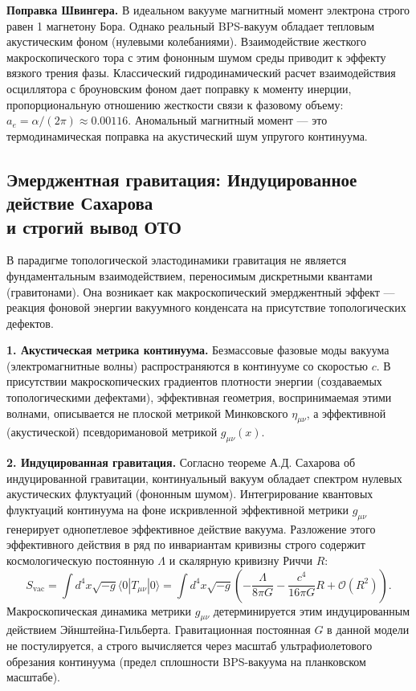 \documentclass[11pt,a4paper]{article}
\begin{document}
	\textbf{Поправка Швингера.} В идеальном вакууме магнитный момент электрона строго равен 1 магнетону Бора. Однако реальный BPS-вакуум обладает тепловым акустическим фоном (нулевыми колебаниями). Взаимодействие жесткого макроскопического тора с этим фононным шумом среды приводит к эффекту вязкого трения фазы. Классический гидродинамический расчет взаимодействия осциллятора с броуновским фоном дает поправку к моменту инерции, пропорциональную отношению жесткости связи к фазовому объему: $a_e = \alpha / (2\pi) \approx 0.00116$. Аномальный магнитный момент — это термодинамическая поправка на акустический шум упругого континуума.
	
	\subsection{Эмерджентная гравитация: Индуцированное действие Сахарова\\ и строгий вывод ОТО}
	В парадигме топологической эластодинамики гравитация не является фундаментальным взаимодействием, переносимым дискретными квантами (гравитонами). Она возникает как макроскопический эмерджентный эффект — реакция фоновой энергии вакуумного конденсата на присутствие топологических дефектов.
	
	\textbf{1. Акустическая метрика континуума.}
	Безмассовые фазовые моды вакуума (электромагнитные волны) распространяются в континууме со скоростью $c$. В присутствии макроскопических градиентов плотности энергии (создаваемых топологическими дефектами), эффективная геометрия, воспринимаемая этими волнами, описывается не плоской метрикой Минковского $\eta_{\mu\nu}$, а эффективной (акустической) псевдоримановой метрикой $g_{\mu\nu}(x)$. 
	
	\textbf{2. Индуцированная гравитация.}
	Согласно теореме А.Д. Сахарова об индуцированной гравитации, континуальный вакуум обладает спектром нулевых акустических флуктуаций (фононным шумом). Интегрирование квантовых флуктуаций континуума на фоне искривленной эффективной метрики $g_{\mu\nu}$ генерирует однопетлевое эффективное действие вакуума. 
	Разложение этого эффективного действия в ряд по инвариантам кривизны строго содержит космологическую постоянную $\Lambda$ и скалярную кривизну Риччи $R$:
	\begin{equation}
		S_{\text{vac}} = \int d^4x \sqrt{-g} \langle 0 | T_{\mu\nu} | 0 \rangle = \int d^4x \sqrt{-g} \left( - \frac{\Lambda}{8\pi G} - \frac{c^4}{16\pi G} R + \mathcal{O}(R^2) \right).
	\end{equation}
	Макроскопическая динамика метрики $g_{\mu\nu}$ детерминируется этим индуцированным действием Эйнштейна-Гильберта. Гравитационная постоянная $G$ в данной модели не постулируется, а строго вычисляется через масштаб ультрафиолетового обрезания континуума (предел сплошности BPS-вакуума на планковском масштабе).
	
\end{document}
